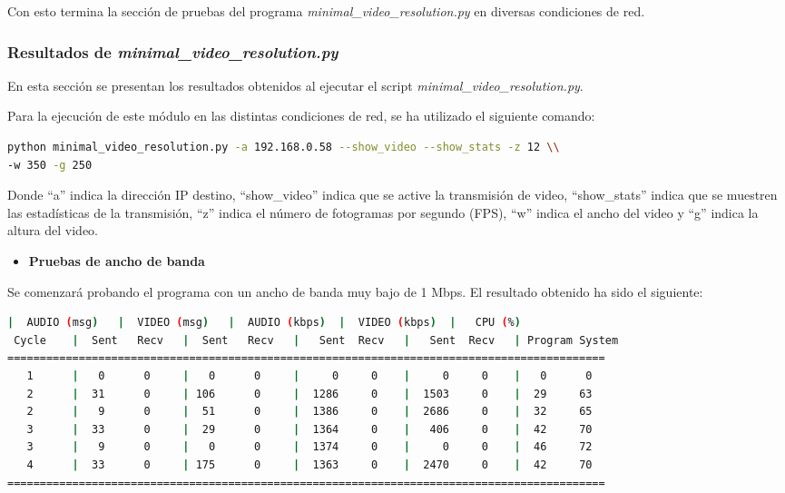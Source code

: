 Con esto termina la sección de pruebas del programa \textit{minimal\_video\_resolution.py} en diversas condiciones de red. 

\newpage

\subsubsection{Resultados de \textit{minimal\_video\_resolution.py}}
En esta sección se presentan los resultados obtenidos al ejecutar el script \textit{minimal\_video\_resolution.py}.

Para la ejecución de este módulo en las distintas condiciones de red, se ha utilizado el siguiente comando:
\begin{lstlisting}[language=bash,basicstyle=\ttfamily\scriptsize]
python minimal_video_resolution.py -a 192.168.0.58 --show_video --show_stats -z 12 \\
-w 350 -g 250
\end{lstlisting}
Donde ``a'' indica la dirección IP destino, ``show\_video'' indica que se active la transmisión de video, ``show\_stats'' indica que se muestren las estadísticas de la transmisión, ``z'' indica el número de fotogramas por segundo (FPS), ``w'' indica el ancho del video y ``g'' indica la altura del video.
\vspace{\baselineskip}

\begin{itemize}
    \item \textbf{Pruebas de ancho de banda}
\end{itemize}

Se comenzará probando el programa con un ancho de banda muy bajo de 1 Mbps. El resultado obtenido ha sido el siguiente:
\vspace{\baselineskip}

\begin{adjustbox}{max width=\textwidth}
\begin{lstlisting}[language=bash,basicstyle=\ttfamily\scriptsize]
          |  AUDIO (msg)   |  VIDEO (msg)   |  AUDIO (kbps)  |  VIDEO (kbps)  |   CPU (%)
 Cycle    |  Sent   Recv   |  Sent   Recv   |   Sent  Recv   |   Sent  Recv   | Program System
============================================================================================
   1      |   0      0     |   0      0     |     0     0    |     0     0    |   0      0
   2      |  31      0     | 106      0     |  1286     0    |  1503     0    |  29     63
   2      |   9      0     |  51      0     |  1386     0    |  2686     0    |  32     65
   3      |  33      0     |  29      0     |  1364     0    |   406     0    |  42     70
   3      |   9      0     |   0      0     |  1374     0    |     0     0    |  46     72
   4      |  33      0     | 175      0     |  1363     0    |  2470     0    |  42     70
============================================================================================
\end{lstlisting}
\end{adjustbox}

